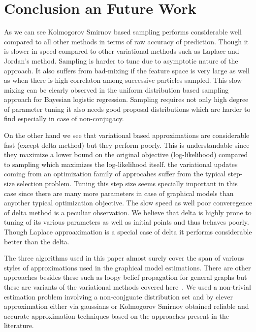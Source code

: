 
\section{Conclusion an Future Work}
As we can see Kolmogorov Smirnov based sampling performs
considerable well compared to all other methods in terms of raw accuracy of
prediction. Though it is slower in speed compared to other variational methods
such as Laplace and Jordan's method. Sampling is harder to tune due to
asymptotic nature of the approach. It also suffers from bad-mixing if the
feature space is very large as well as when there is high correlaton among
successive particles sampled. This slow mixing can be clearly observed in the
uniform distribution based sampling approach for Bayesian logistic regression.
Sampling requires not only high degree of parameter tuning it also needs good
proposal distributions which are harder to find especially in case of
non-conjugacy. 

On the other hand we see that variational based approximations are considerable
fast (except delta method) but they perform poorly. This is understandable since
they maximize a lower bound on the original objective (log-likelihood) compared
to sampling which maximizes the log-likelihood itself. the variational updates
coming from an optimization family of approcahes suffer from the typical
step-size selection problem. Tuning this step size seems specially important in
this case since there are many more parameters in case of graphical models than
anyother typical optimization objective. The slow speed as well poor
converegence of delta method is a peculiar observation. We believe that delta is
highly prone to tuning of its various parameters as well as initial points and
thus behaves poorly. Though Laplace approaximation is a special case of delta it
performs considerable better than the delta. 

The three algorithms used in this paper almost surely cover the
span of various styles of approximations used in the graphical model
estimations. There are other approaches besides these such as
loopy belief propagation for general graphs but these are variants of the 
variational methods covered here~\cite{Heskes02}. We used a non-trivial
estimation problem involving a non-conjguate distribution set and by clever
approximation either via gaussians or Kolmogorov Smirnov obtained reliable and
accurate approximation techniques based on the approaches present in the
literature.

